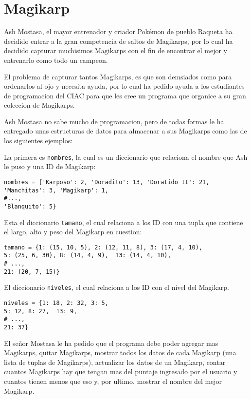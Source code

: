 \section{Magikarp}

Ash Mostasa, el mayor entrenador y criador Pokémon de pueblo Raqueta ha decidido entrar a la gran competencia de saltos de Magikarps, por lo cual ha decidido capturar muchisimos Magikarps con el fin de encontrar el mejor y entrenarlo como todo un campeon.

El problema de capturar tantos Magikarps, es que son demsiados como para ordenarlos al ojo y necesita ayuda, por lo cual ha pedido ayuda a los estudiantes de programacion del CIAC para que les cree un programa que organice a su gran coleccion de Magikarps.

Ash Mostasa no sabe mucho de programacion, pero de todas formas le ha entregado unas estructuras de datos para almacenar a sus Magikarps como las de los siguientes ejemplos:

La primera es \texttt{nombres}, la cual es un diccionario que relaciona el nombre que Ash le puso y una ID de Magikarp:

\begin{lstlisting}[style=consola]
nombres = {'Karposo': 2, 'Doradito': 13, 'Doratido II': 21,
'Manchitas': 3, 'Magikarp': 1,
#...,
'Blanquito': 5}

\end{lstlisting}

Esta el diccionario \texttt{tamano}, el cual relaciona a los ID con una tupla que contiene el largo, alto y peso del Magikarp en cuestion:

\begin{lstlisting}[style=consola]
tamano = {1: (15, 10, 5), 2: (12, 11, 8), 3: (17, 4, 10), 
5: (25, 6, 30), 8: (14, 4, 9),  13: (14, 4, 10), 
# ...,
21: (20, 7, 15)}
\end{lstlisting}

El diccionario \texttt{niveles}, el cual relaciona a los ID con el nivel del Magikarp.

\begin{lstlisting}[style=consola]
niveles = {1: 18, 2: 32, 3: 5, 
5: 12, 8: 27,  13: 9, 
# ...,
21: 37}
\end{lstlisting}

El señor Mostasa le ha pedido que el programa debe poder agregar mas Magikarps, quitar Magikarps, mostrar todos los datos de cada Magikarp (una lista de tuplas de Magikarps), actualizar los datos de un Magikarp, contar cuantos Magikarps hay que tengan mas del puntaje ingresado por el usuario y cuantos tienen menos que eso y, por ultimo, mostrar el nombre del mejor Magikarp.

